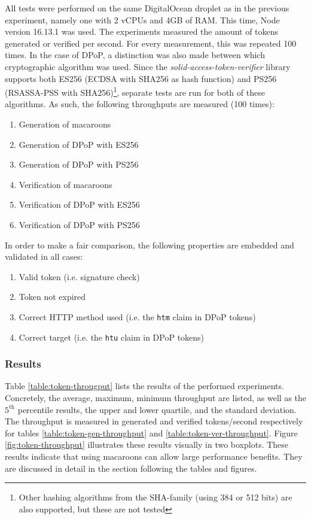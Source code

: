 All tests were performed on the same DigitalOcean droplet as in the previous experiment, namely one with 2 vCPUs and 4GB of RAM. This time, Node version 16.13.1 was used. The experiments measured the amount of tokens generated or verified per second. For every measurement, this was repeated 100 times. In the case of \gls{DPoP}, a distinction was also made between which cryptographic algorithm was used. Since the  \textit{solid-access-token-verifier} library supports both ES256 (ECDSA with SHA256 as hash function) and PS256 (RSASSA-PSS with SHA256)\footnote{Other hashing algorithms from the SHA-family (using 384 or 512 bits) are also supported, but these are not tested}, separate tests are run for both of these algorithms. As such, the following throughputs are measured (100 times):
\begin{enumerate}
    \item Generation of macaroons
    \item Generation of \gls{DPoP} with ES256
    \item Generation of \gls{DPoP} with PS256
    \item Verification of macaroons
    \item Verification of \gls{DPoP} with ES256
    \item Verification of \gls{DPoP} with PS256
\end{enumerate}

\noindent In order to make a fair comparison, the following properties are embedded and validated in all cases:
\begin{enumerate}
    \item Valid token (i.e. signature check)
    \item Token not expired
    \item Correct HTTP method used (i.e. the \texttt{htm} claim in \gls{DPoP} tokens)
    \item Correct target (i.e. the \texttt{htu} claim in \gls{DPoP} tokens)
\end{enumerate}

\subsubsection{Results}
Table \ref{table:token-througput} lists the results of the performed experiments. Concretely, the average, maximum, minimum throughput are listed, as well as the $5^{\text{th}}$ percentile results, the upper and lower quartile, and the standard deviation. The throughput is measured in generated and verified tokens/second respectively for tables \ref{table:token-gen-throughput} and \ref{table:token-ver-throughput}. Figure \ref{fig:token-throughput} illustrates these results visually in two boxplots. These results indicate that using macaroons can allow large performance benefits. They are discussed in detail in the section following the tables and figures.



